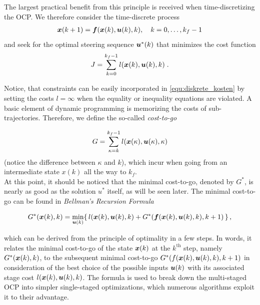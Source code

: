 The largest practical benefit from this principle is received when time-discretizing the OCP. We therefore consider the time-discrete process
\begin{align} \label{equ:diskreter_prozess}
	\bs x(k+1) = \bs f(\bs x(k), \bs u(k), k), \quad k=0,\ldots, k_f-1
\end{align}
and seek for the optimal steering sequence $\boldsymbol{u}^\ast (k)$ that minimizes the cost function
\begin{align}
	J = \sum_{k=0}^{k_f-1} l(\bs x(k), \bs u(k),k) \;. \label{equ:diskrete_kosten} %
\end{align}

Notice, that constraints can be easily incorporated in \eqref{equ:diskrete_kosten} by setting the costs $l=\infty$ when the equality or inequality equations are violated.
A basic element of dynamic programming is memorizing the costs of sub-trajectories. Therefore, we define the so-called \emph{cost-to-go}

\begin{align*}
	G = \sum_{\kappa = k}^{k_f-1} l(\bs x(\kappa), \bs u(\kappa),\kappa) %
\end{align*}
(notice the difference between $\kappa$ and $k$), which incur when going from an intermediate state $x(k)$ all the way to $k_f$.\\
At this point, it should be noticed that the minimal cost-to-go, denoted by $G^\ast$, is nearly as good as the solution $u^\ast$ itself, as will be seen later. The minimal cost-to-go can be found in \emph{Bellman’s Recursion Formula}
\begin{mydef}
\begin{align*}
 G^\ast(\boldsymbol{x}(k),k) = \min_{\boldsymbol{u}(k)}\{\,l(\boldsymbol{x}(k), \boldsymbol{u}(k), k) + G^\ast(\boldsymbol{f}(\boldsymbol{x}(k), \boldsymbol{u}(k), k), k+1)\,\} \, ,
\end{align*}
\end{mydef}

which can be derived from the principle of optimality in a few steps. 
In words, it relates the minimal cost-to-go of the state $\boldsymbol{x}(k)$ at the $k^\mathrm{th}$  step, namely $G^\ast (\boldsymbol{x}(k),k)$, to the subsequent minimal cost-to-go $G^\ast (f(\boldsymbol{x}(k),\boldsymbol{u}(k),k),k+1)$ in consideration of the best choice of the possible inputs $\boldsymbol{u}(k)$ with its associated stage cost $l(\boldsymbol{x}(k),\boldsymbol{u}(k),k)$. The formula is used to break down the multi-staged OCP into simpler single-staged optimizations, which numerous algorithms exploit it to their advantage.


